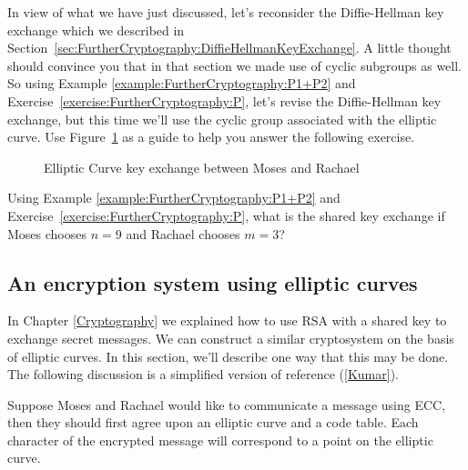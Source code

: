 In view of what we have just discussed, let's reconsider the Diffie-Hellman key exchange which we described in Section~\ref{sec:FurtherCryptography:DiffieHellmanKeyExchange}. A little thought should convince you that in that section we made use of cyclic subgroups as well. So using Example \ref{example:FurtherCryptography:P1+P2} and Exercise~\ref{exercise:FurtherCryptography:P}, let's revise the Diffie-Hellman key exchange, but this time we'll use the cyclic group associated with the elliptic curve.  Use Figure~\ref{fig:DH:DHKE_8} as a guide to help you answer the following exercise.

\begin{figure}[htbp]
	  \caption{\label{fig:DH:DHKE_8} Elliptic Curve key exchange between Moses and Rachael }
\end{figure}

\begin{exer}
Using Example \ref{example:FurtherCryptography:P1+P2} and Exercise~\ref{exercise:FurtherCryptography:P}, what is the shared key exchange if Moses chooses $n = 9$ and Rachael chooses $m = 3$?
\end{exer}

\subsection{An encryption system using elliptic curves} 
\label{subsec:FurtherCryptography:EllipticalCurve:EncryptionSystem} 

In Chapter \ref{Cryptography} we explained how to use RSA with a shared key to exchange secret messages.  We can construct a similar cryptosystem on the basis of elliptic curves. In this section, we'll describe one way that this may be done. The following discussion is a simplified version of reference (\ref{Kumar}).

Suppose Moses and Rachael would like to communicate a message using ECC, then they should first agree upon an elliptic curve and a code table. Each character of the encrypted message will correspond to a point on the elliptic curve.

